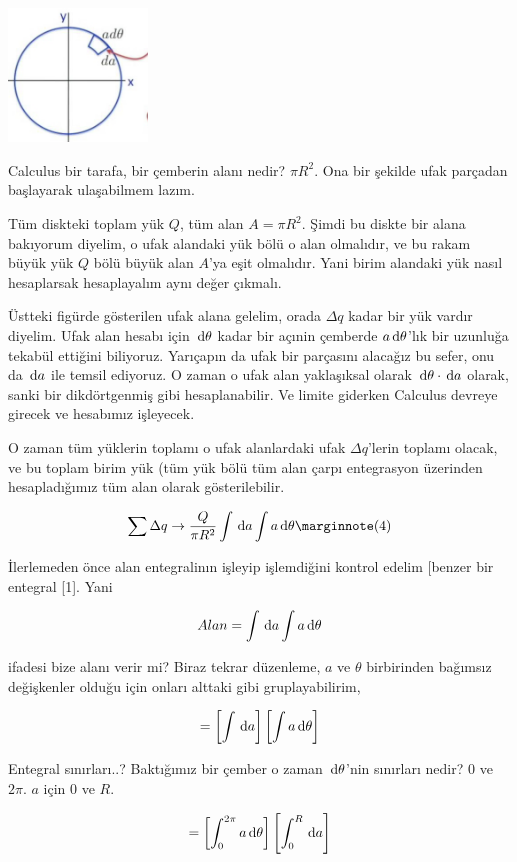 \documentclass[12pt,fleqn]{article}\usepackage{../../common}
\begin{document}
\includegraphics[width=10em]{06_09.jpg}

Calculus bir tarafa, bir çemberin alanı nedir? $\pi R^2$. Ona bir şekilde ufak
parçadan başlayarak ulaşabilmem lazım. 

Tüm diskteki toplam yük $Q$, tüm alan $A = \pi R^2$. Şimdi bu diskte bir alana
bakıyorum diyelim, o ufak alandaki yük bölü o alan olmalıdır, ve bu rakam büyük
yük $Q$ bölü büyük alan $A$'ya eşit olmalıdır. Yani birim alandaki yük nasıl
hesaplarsak hesaplayalım aynı değer çıkmalı.

Üstteki figürde gösterilen ufak alana gelelim, orada $\Delta q$ kadar bir yük
vardır diyelim. Ufak alan hesabı için $\,\mathrm{d} \theta$ kadar bir açınin çemberde $a
\,\mathrm{d} \theta$'lık bir uzunluğa tekabül ettiğini biliyoruz. Yarıçapın da ufak bir
parçasını alacağız bu sefer, onu da $\,\mathrm{d} a$ ile temsil ediyoruz. O zaman o ufak
alan yaklaşıksal olarak $\,\mathrm{d} \theta \cdot \,\mathrm{d} a$ olarak, sanki bir dikdörtgenmiş
gibi hesaplanabilir. Ve limite giderken Calculus devreye girecek ve hesabımız
işleyecek. 

O zaman tüm yüklerin toplamı o ufak alanlardaki ufak $\Delta q$'lerin toplamı
olacak, ve bu toplam birim yük (tüm yük bölü tüm alan çarpı entegrasyon
üzerinden hesapladığımız tüm alan olarak gösterilebilir.

$$
\sum \Delta q \to \frac{Q}{\pi R^2} \int \ud a \int a \ud\theta \mlabel{4}
$$

İlerlemeden önce alan entegralinın işleyip işlemdiğini kontrol edelim [benzer
 bir entegral [1]. Yani

$$
Alan = \int \,\mathrm{d} a \int a \,\mathrm{d} \theta
$$

ifadesi bize alanı verir mi? Biraz tekrar düzenleme, $a$ ve $\theta$ birbirinden
bağımsız değişkenler olduğu için onları alttaki gibi gruplayabilirim,

$$
= \left[ \int \,\mathrm{d} a \right] \left[ \int a \,\mathrm{d} \theta \right]
$$

Entegral sınırları..? Baktığımız bir çember o zaman $\,\mathrm{d} \theta$'nin sınırları
nedir? 0 ve $2\pi$. $a$ için 0 ve $R$.

$$
=  \left[ \int_{0}^{2\pi} a \,\mathrm{d} \theta \right] \left[ \int_{0}^{R} \,\mathrm{d} a \right]
$$
\end{document}
